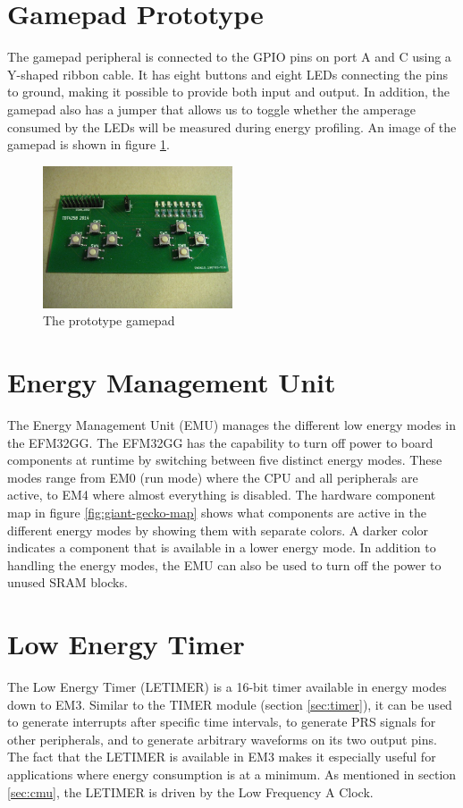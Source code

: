 \section{Gamepad Prototype}
The gamepad peripheral is connected to the GPIO pins on port A and C using a Y-shaped ribbon cable. It has eight buttons and eight LEDs connecting the pins to ground, making it possible to provide both input and output. In addition, the gamepad also has a jumper that allows us to toggle whether the amperage consumed by the LEDs will be measured during energy profiling. An image of the gamepad is shown in figure \ref{fig:gamepad}.

\begin{figure}[ht]
  \centering
  \includegraphics[width=0.5\textwidth]{images/gamepad.jpg}
  \caption{The prototype gamepad}\label{fig:gamepad}
\end{figure}


\section{Energy Management Unit}\label{sec:emu}
The Energy Management Unit (EMU) manages the different low energy modes in the EFM32GG. The EFM32GG has the capability to turn off power to board components at runtime by switching between five distinct energy modes. These modes range from EM0 (run mode) where the CPU and all peripherals are active, to EM4 where almost everything is disabled. The hardware component map in figure \ref{fig:giant-gecko-map} shows what components are active in the different energy modes by showing them with separate colors. A darker color indicates a component that is available in a lower energy mode. In addition to handling the energy modes, the EMU can also be used to turn off the power to unused SRAM blocks.\cite{efm32gg-rm}


\section{Low Energy Timer}\label{sec:letimer}
The Low Energy Timer (LETIMER) is a 16-bit timer available in energy modes down to EM3. Similar to the TIMER module (section \ref{sec:timer}), it can be used to generate interrupts after specific time intervals, to generate PRS signals for other peripherals, and to generate arbitrary waveforms on its two output pins. The fact that the LETIMER is available in EM3 makes it especially useful for applications where energy consumption is at a minimum. As mentioned in section \ref{sec:cmu}, the LETIMER is driven by the Low Frequency A Clock.

